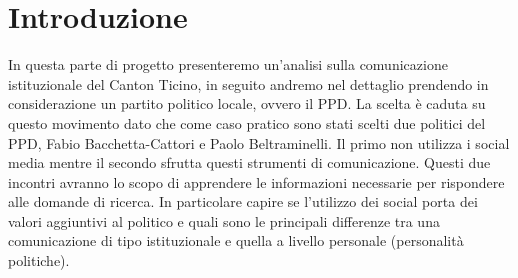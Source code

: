 \section{Introduzione}
In questa parte di progetto presenteremo un’analisi sulla comunicazione istituzionale del Canton Ticino, in seguito andremo nel dettaglio prendendo in considerazione un partito politico locale, ovvero il PPD. La scelta è caduta su questo movimento dato che come caso pratico sono stati scelti due politici del PPD, Fabio Bacchetta-Cattori e Paolo Beltraminelli. Il primo non utilizza i social media mentre il secondo sfrutta questi strumenti di comunicazione. Questi due incontri avranno lo scopo di apprendere le informazioni necessarie per rispondere alle domande di ricerca. In particolare capire se l’utilizzo dei social porta dei valori aggiuntivi al politico e quali sono le principali differenze tra una comunicazione di tipo istituzionale e quella a livello personale (personalità politiche).